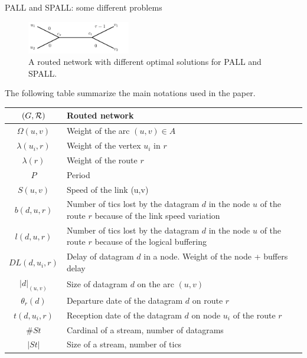 \documentclass[10pt]{article}
\newcommand\pall{\textsc{PALL}\xspace}
\newcommand\spall{\textsc{SPALL}\xspace}
\begin{document}
\begin{subsection}{\pall and \spall: some different problems}
  \begin{figure}
  \begin{center}
 \includegraphics[width=0.4\textwidth]{examplestar}
\caption{A routed network with different optimal solutions for PALL and SPALL.}\label{fig:pallpallexample}
\end{center}
\end{figure}
  
    \end{subsection}
    
    The following table summarize the main notations used in the paper.
      \begin{center}
   \begin{tabularx}{0.8\textwidth}{|c|X|}
    \hline
     $(G,\cal R)$ & Routed network \\
     \hline
      $\Omega(u,v)$ & Weight of the arc $(u,v) \in A$ \\
      \hline
      $\lambda(u_i,r)$ & Weight of the vertex $u_i$ in $r$\\
    \hline
    $\lambda(r)$ & Weight of the route $r$\\
    \hline
    $P$ & Period\\
    \hline
    $S(u,v)$ & Speed of the link (u,v)\\
    \hline
    $b(d,u,r)$ & Number of tics lost by the datagram $d$ in the node $u$ of the route $r$ because of the link speed variation \\
    \hline
    $l(d,u,r)$ & Number of tics lost by the datagram $d$ in the node $u$ of the route $r$ because of the logical buffering \\
    \hline
    $DL(d,u_i,r)$ & Delay of datagram $d$ in a node. Weight of the node + buffers delay\\
    \hline
    $|d|_{(u,v)}$ & Size of datagram $d$ on the arc $(u,v)$ \\
    \hline
    $\theta_r(d)$ & Departure date of the datagram $d$ on route $r$ \\
    \hline
    $t(d,u_i,r)$ & Reception date of the datagram $d$ on node $u_i$ of the route $r$\\
    \hline
    $\#St$ & Cardinal of a stream, number of datagrams \\
    \hline
    $|St|$ & Size of a stream, number of tics \\       

\end{tabularx}
\end{center}
\end{document}
